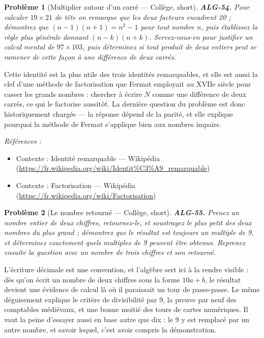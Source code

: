 \documentclass[11pt]{article}
\newtheorem{problem}{Problème}
\newenvironment{refs}{\par\small\noindent\emph{Références :}\begin{itemize}\setlength\itemsep{0pt}}{\end{itemize}\normalsize}
\begin{document}
\bigskip

\begin{problem}[{Multiplier autour d'un carré --- Collège, short}]
\textbf{ALG-54.} Pour calculer $ 19 \times 21 $ de tête on remarque que les
deux facteurs encadrent 20 ; démontrez que $ (n-1)(n+1) = n^2 - 1 $ pour tout nombre $ n $, puis
établissez la règle plus générale donnant $ (n-k)(n+k) $. Servez-vous-en pour justifier un calcul
mental de $ 97 \times 103 $, puis déterminez si tout produit de deux entiers peut se ramener de
cette façon à une différence de deux carrés.
\end{problem}

\noindent Cette identité est la plus utile des trois identités remarquables, et elle est
aussi la clef d'une méthode de factorisation que Fermat employait au XVIIe siècle pour
casser les grands nombres : chercher à écrire $ N $ comme une différence de deux carrés, ce qui
le factorise aussitôt. La dernière question du problème est donc historiquement chargée --- la
réponse dépend de la parité, et elle explique pourquoi la méthode de Fermat s'applique bien aux
nombres impairs.

\begin{refs}
\item Contexte : Identité remarquable --- Wikipédia (\url{https://fr.wikipedia.org/wiki/Identit%C3%A9_remarquable})
\item Contexte : Factorisation --- Wikipédia (\url{https://fr.wikipedia.org/wiki/Factorisation})
\end{refs}

\bigskip

\begin{problem}[{Le nombre retourné --- Collège, short}]
\textbf{ALG-55.} Prenez un nombre entier de deux chiffres, retournez-le, et
soustrayez le plus petit des deux nombres du plus grand ; démontrez que le résultat est toujours un
multiple de 9, et déterminez exactement quels multiples de 9 peuvent être obtenus. Reprenez ensuite
la question avec un nombre de trois chiffres et son retourné.
\end{problem}

\noindent L'écriture décimale est une convention, et l'algèbre sert ici à la rendre
visible : dès qu'on écrit un nombre de deux chiffres sous la forme $ 10a + b $, le résultat
devient une évidence de calcul là où il paraissait un tour de passe-passe. Le même déguisement
explique le critère de divisibilité par 9, la preuve par neuf des comptables médiévaux, et une
bonne moitié des tours de cartes numériques. Il vaut la peine d'essayer aussi en base autre que
dix : le 9 y est remplacé par un autre nombre, et savoir lequel, c'est avoir compris la
démonstration.
\end{document}
